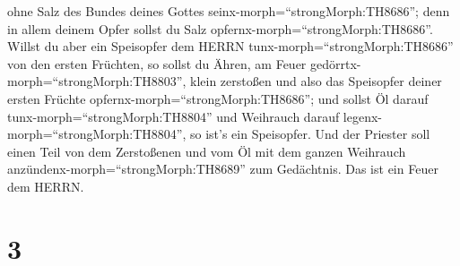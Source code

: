 ohne Salz des Bundes deines Gottes seinx-morph=``strongMorph:TH8686'';
denn in allem deinem Opfer sollst du Salz
opfernx-morph=``strongMorph:TH8686''.  Willst du aber ein
Speisopfer dem HERRN tunx-morph=``strongMorph:TH8686'' von den ersten
Früchten, so sollst du Ähren, am Feuer
gedörrtx-morph=``strongMorph:TH8803'', klein zerstoßen und also das
Speisopfer deiner ersten Früchte opfernx-morph=``strongMorph:TH8686'';
 und sollst Öl darauf tunx-morph=``strongMorph:TH8804'' und
Weihrauch darauf legenx-morph=``strongMorph:TH8804'', so ist's ein
Speisopfer.  Und der Priester soll einen Teil von dem
Zerstoßenen und vom Öl mit dem ganzen Weihrauch
anzündenx-morph=``strongMorph:TH8689'' zum Gedächtnis. Das ist ein Feuer
dem HERRN.

\hypertarget{section-2}{%
\section{3}\label{section-2}}

